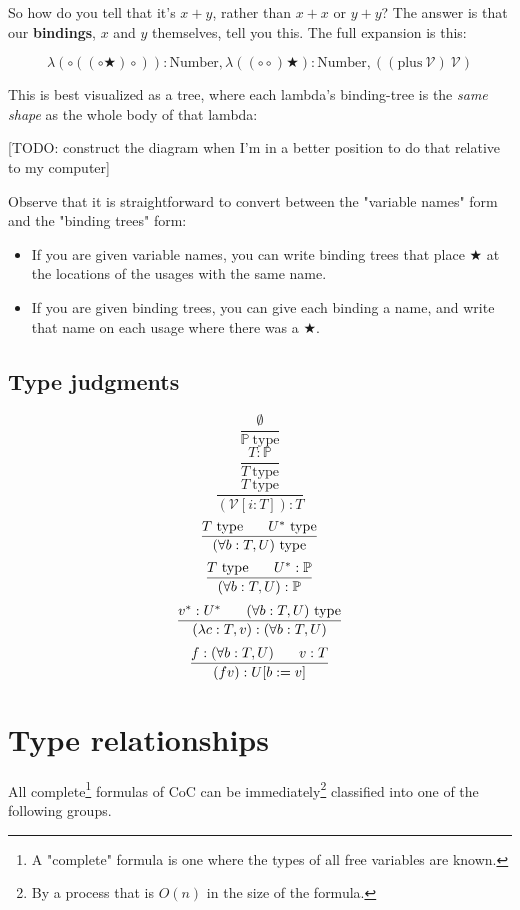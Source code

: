 \documentclass{article}
\newcommand{\Prop}{\mathbb{P}}
\newcommand{\istype}{\ \mathrm{type}}
\newcommand{\usage}{\mathcal{V}}
\newcommand{\usageKnown}[2]{(\usage[#2:#1])}
\newcommand{\presep}{\hspace{1.8em}}
\newcommand{\subst}[3]{#1[#2:=#3]}
\newcommand{\subty}[1]{#1^*}
\newcommand{\bindvariable}{\bigstar}
\newcommand{\bindnotthis}{\circ}
\begin{document}
  So how do you tell that it's $x + y$, rather than $x + x$ or $y + y$? The answer is that our \textbf{bindings}, $x$ and $y$ themselves, tell you this. The full expansion is this:
  
  \[ \lambda (\bindnotthis((\bindnotthis \bindvariable) \bindnotthis)) : \mathrm{Number}, \lambda ((\bindnotthis \bindnotthis) \bindvariable) : \mathrm{Number}, ((\mathrm{plus}\ \usage)\ \usage) \]
  
  This is best visualized as a tree, where each lambda's binding-tree is the \emph{same shape} as the whole body of that lambda:
  
  [TODO: construct the diagram when I'm in a better position to do that relative to my computer]
  
  Observe that it is straightforward to convert between the "variable names" form and the "binding trees" form:
  \begin{itemize}
    \item If you are given variable names, you can write binding trees that place $\bindvariable$ at the locations of the usages with the same name.
    \item If you are given binding trees, you can give each binding a name, and write that name on each usage where there was a $\bindvariable$.
  \end{itemize}
  
  
  \subsection{Type judgments}
    
  
  \[ \frac{\emptyset}{\Prop\istype} \]
  \[ \frac{T : \Prop}{T\istype} \]
  \[ \frac{T\istype}{\usageKnown{T}{i}:T} \]
  \[ \frac{T\istype\presep \subty{U}\istype}{(\forall b:T,U)\istype} \]
  \[ \frac{T\istype\presep \subty{U} : \Prop}{(\forall b:T,U) : \Prop} \]
  \[ \frac{\subty{v} : \subty{U} \presep (\forall b:T,U)\istype}{(\lambda c:T,v) : (\forall b:T,U)} \]
  \[ \frac{f : (\forall b:T,U) \presep v : T}{(f v) : \subst{U}{b}{v}} \]
  

  \section{Type relationships}
  All complete\footnote{A "complete" formula is one where the types of all free variables are known.} formulas of CoC can be immediately\footnote{By a process that is $O(n)$ in the size of the formula.} classified into one of the following groups.
\end{document}
